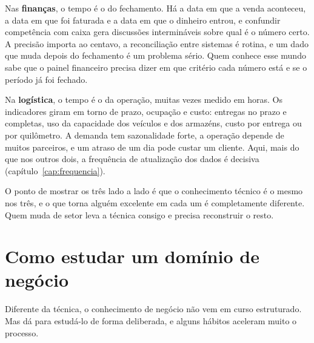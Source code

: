 Nas \textbf{finanças}, o tempo é o do fechamento. Há a data em que a venda aconteceu, a data
em que foi faturada e a data em que o dinheiro entrou, e confundir competência com caixa
gera discussões intermináveis sobre qual é o número certo. A precisão importa ao centavo, a
reconciliação entre sistemas é rotina, e um dado que muda depois do fechamento é um
problema sério. Quem conhece esse mundo sabe que o painel financeiro precisa dizer em que
critério cada número está e se o período já foi fechado.

Na \textbf{logística}, o tempo é o da operação, muitas vezes medido em horas. Os
indicadores giram em torno de prazo, ocupação e custo: entregas no prazo e completas, uso
da capacidade dos veículos e dos armazéns, custo por entrega ou por quilômetro. A demanda
tem sazonalidade forte, a operação depende de muitos parceiros, e um atraso de um dia pode
custar um cliente. Aqui, mais do que nos outros dois, a frequência de atualização dos dados
é decisiva (capítulo~\ref{cap:frequencia}).


O ponto de mostrar os três lado a lado é que o conhecimento técnico é o mesmo nos três, e
o que torna alguém excelente em cada um é completamente diferente. Quem muda de setor leva
a técnica consigo e precisa reconstruir o resto.

\section{Como estudar um domínio de negócio}
\label{sec:estudar-dominio}

Diferente da técnica, o conhecimento de negócio não vem em curso estruturado. Mas dá para
estudá-lo de forma deliberada, e alguns hábitos aceleram muito o processo.

